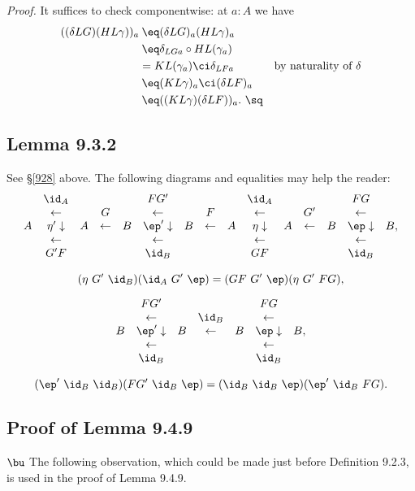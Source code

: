 \documentclass[12pt]{article}
\begin{document}
\nn\emph{Proof.} It suffices to check componentwise: at $a:A$ we have
\begin{align*}
((\delta LG)(HL\gamma))_a
&\:\eq(\delta LG)_{a}(HL\gamma)_a\\
&\:\eq\delta_{LGa}\circ HL(\gamma_a)\\
&= KL(\gamma_a)\ci\delta_{LFa}&\text{by naturality of $\delta$}\\
&\:\eq(KL\gamma)_a\ci(\delta LF)_a\\
&\:\eq((KL\gamma)(\delta LF))_a.\ \sq
\end{align*}


\subsection{Lemma 9.3.2}

See \S\ref{928} above. The following diagrams and equalities may help the reader:
$$
\begin{array}{ccccccccccccccc}
&\id_A&&&&FG'&&&&\id_A&&&&FG\\
&\leftarrow&&G&&\leftarrow&&F&&\leftarrow&&G'&&\leftarrow\\
A&\eta'\downarrow&A&\leftarrow&B&\ep'\downarrow&B&\leftarrow&A&\eta\downarrow&A&\leftarrow&B&\ep\downarrow&B,\\
&\leftarrow&&&&\leftarrow&&&&\leftarrow&&&&\leftarrow\\
&G'F&&&&\id_B&&&&GF&&&&\id_B
\end{array}
$$ 

$$
(\eta\ G'\ \id_B)(\id_A\ G'\ \ep)=(GF\ G'\ \ep)(\eta\ G'\ FG),
$$

$$
\begin{array}{ccccccc}
&FG'&&&&FG\\
&\leftarrow&&\id_B&&\leftarrow\\
B&\ep'\downarrow&B&\leftarrow&B&\ep\downarrow&B,\\
&\leftarrow&&&&\leftarrow\\
&\id_B&&&&\id_B
\end{array}
$$

$$
(\ep'\ \id_B\ \id_B)(FG'\ \id_B\ \ep)=(\id_B\ \id_B\ \ep)(\ep'\ \id_B\ FG).
$$


\subsection{Proof of Lemma 9.4.9}

$\bu$ The following observation, which could be made just before Definition 9.2.3, is used in the proof of Lemma 9.4.9.
\end{document}
